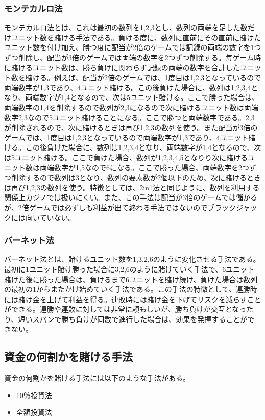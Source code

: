 \subsubsection{モンテカルロ法}
モンテカルロ法とは、これは最初の数列を1,2,3とし、数列の両端を足した数だけユニット数を賭ける手法である。負ける度に、数列に直前にその直前に賭けたユニット数を付け加え、勝つ度に配当が2倍のゲームでは記録の両端の数字を1つずつ削除し、配当が3倍のゲームでは両端の数字を2つずつ削除する。毎ゲーム時に賭けるユニット数は、勝ち負けに関わらず記録の両端の数字を合計したユニット数を賭ける。例えば、配当が2倍のゲームでは、1度目は1,2,3となっているので両端数字が1,3であり、4ユニット賭ける。この後負けた場合に、数列は1,2,3,4となり、両端数字が1,4となるので、次は5ユニット賭ける。ここで勝った場合は、両端数字の1,4を削除するので数列が2,3になるので次に賭けるユニット数は両端数字2,3なので5ユニット賭けることになる。ここで勝つと両端数字である。2,3が削除されるので、次に賭けるときは再び1,2,3の数列を使う。また配当が3倍のゲームでは、1度目は1,2,3となっているので両端数字が1,3であり、4ユニット賭ける。この後負けた場合に、数列は1,2,3,4となり、両端数字が1,4となるので、次は5ユニット賭ける。ここで負けた場合、数列が1,2,3,4,5となりり次に賭けるユニット数は両端数字が1,5なので6になる。ここで勝った場合、両端数字を2つずつ削除するので数列は3となり、数列の要素数が2個以下のため、次に賭けるときは再び1,2,3の数列を使う。特徴としては、2in1法と同じように、数列を利用する関係上カジノでは扱いにくい。また、この手法は配当が3倍のゲームでは儲かるが、2倍ゲームでは必ずしも利益が出て終わる手法ではないのでブラックジャックには向いていない。
\subsubsection{バーネット法}
バーネット法とは、賭けるユニット数を1,3,2,6のように変化させる手法である。最初に1ユニット賭け勝った場合に3,2,6のように賭けていく手法で、6ユニット賭けた後に勝った場合は、負けるまで6ユニットを賭け続け、負けた場合は数列の最初の1からまたかけ始めていく手法である。この手法の特徴として、連勝時には賭け金を上げて利益を得る。連敗時には賭け金を下げてリスクを減らすことができる。連勝や連敗に対しては非常に頼もしいが、勝ち負けが交互となったり、短いスパンで勝ち負けが同数で進行した場合は、効果を発揮することができない。

\subsection{資金の何割かを賭ける手法}
資金の何割かを賭ける手法には以下のような手法がある。
\begin{itemize}
\item 10％投資法
\item 全額投資法
\end{itemize}
